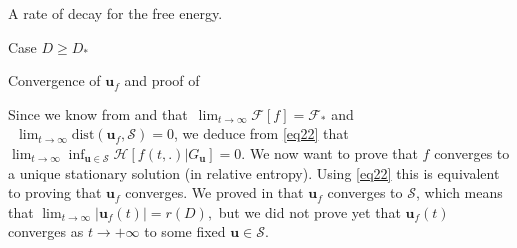 \documentclass[reqno]{amsart} %
\begin{document}
\begin{section}{A rate of decay for the free energy.}
\begin{subsection}{Case \texorpdfstring{$D\geq D_*$}{DD*}}
\end{subsection}


\begin{section}{Convergence of \texorpdfstring{$\mathbf{u}_{f}$}{uf} and proof of~\texorpdfstring{}{thm2}}

\label{sec:sec4}
Since we know from  and  that~$ \lim_{t\rightarrow \infty}\mathcal{F}[f]=\mathcal{F}_*$  and  \\ \hbox{~$ \lim_{t \rightarrow \infty}{\mathrm{dist}(\mathbf{u}_{f}, \mathcal{S})}=0$}, we deduce from \eqref{eq22} that $\lim_{t \rightarrow \infty}\inf_{\mathbf{u}\in \mathcal{S}}\mathcal{H}[f(t,.)|G_\mathbf{u}]=0$. We now want to prove that $f$ converges to a unique stationary solution (in relative entropy). Using \eqref{eq22} this is equivalent to proving that $\mathbf{u}_{f}$ converges.
 We proved in  that $\mathbf{u}_{f}$ converges to $\mathcal{S}$, which means that $\lim_{t\rightarrow\infty}|\mathbf{u}_{f}(t)|=r(D), $ but we did not prove yet that $\mathbf{u}_{f}(t)$ converges as $t \rightarrow + \infty$ to some fixed $\mathbf{u}\in \mathcal{S}$.



\end{section}
\end{section}
\end{document}
